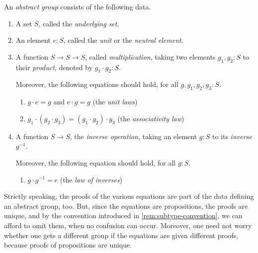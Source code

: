 \begin{definition}\label{def:abstractgroup}
  An \emph{abstract group}
  consists of the following data.
  \begin{enumerate}
  \item\label{struc:under-set} A set $S$, called the \emph{underlying set}.
  \item\label{struc:unit} An element $e:S$, called the \emph{unit} or the \emph{neutral element}.
  \item\label{struc:mult-op} A function $S\to S\to S$, called \emph{multiplication},
    taking two elements $g_1,g_2:S$ to their \emph{product}, denoted by $g_1\cdot g_2:S$.
    \par \noindent
    Moreover, the following equations should hold, for all $g,g_1,g_2,g_3 : S$.
    \begin{enumerate}[label=(\alph*),ref=\ref{struc:mult-op} (\alph*)]
    \item\label{axiom:unit-laws} $g\cdot e=g$ and $e\cdot g=g$ (the \emph{unit laws})
    \item\label{axiom:ass-law} $g_1\cdot(g_2\cdot g_3)=(g_1\cdot g_2)\cdot g_3$ (the \emph{associativity law})
    \end{enumerate}
  \item\label{struc:inv-op} A function $S\to S$, the \emph{inverse operation},
    taking an element $g:S$ to its \emph{inverse} $g^{-1}$.
    \par \noindent
    Moreover, the following equation should hold, for all $g:S$.
    \begin{enumerate}[label=(\alph*),ref=\ref{struc:inv-op} (\alph*),resume*]
    \item\label{axiom:inv-law} $ g\cdot g^{-1} = e$ (the \emph{law of inverses})
    \qedhere
    \end{enumerate}
  \end{enumerate}
\end{definition}

\begin{remark}
  Strictly speaking, the proofs of the various equations are part of the data defining an abstract group, too.  But, since the equations are
  propositions, the proofs are unique, and by the convention introduced in \cref{rem:subtype-convention}, we can afford to omit them, when no confusion can occur.  Moreover, one need not worry whether one gets a different group if the equations are given different proofs, because proofs of
  propositions are unique.
\end{remark}

